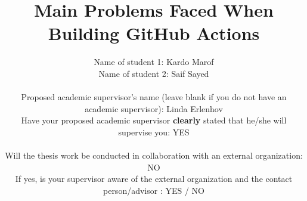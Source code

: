 \documentclass[conference]{IEEEtran}
\begin{document}
\title{Main Problems Faced When Building GitHub Actions\\
}

\author{Name of student 1: Kardo Marof \\
Name of student 2: Saif Sayed\\ \\
Proposed academic supervisor's name (leave blank if you do not have an academic supervisor): Linda Erlenhov\\
Have your proposed academic supervisor \textbf{clearly} stated that he/she will supervise you: YES \\ \\
Will the thesis work be conducted in collaboration with an external organization: NO \\
If yes, is your supervisor aware of the external organization and the contact person/advisor : YES / NO
}

\maketitle
\end{document}
